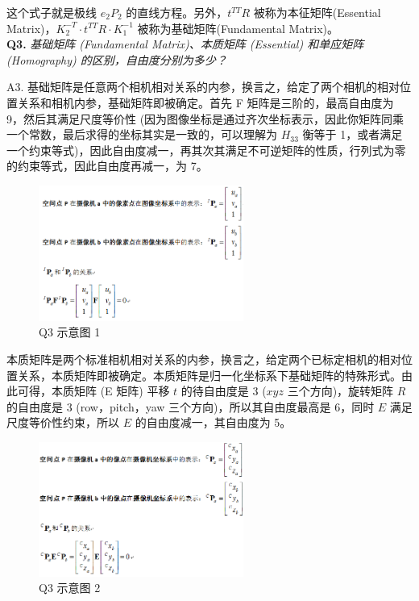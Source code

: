 \documentclass[cn,10pt,math=newtx,citestyle=gb7714-2015,bibstyle=gb7714-2015]{elegantbook}
\begin{document}
这个式子就是极线 $e_2P_2$ 的直线方程。另外，$t^{TT}R$ 被称为本征矩阵(Essential Matrix)，$K_2^{-T} \cdot   t^{TT}R\cdot K_1^{-1}$ 被称为基础矩阵(Fundamental Matrix)。\\


\textbf{Q3.} \textit{基础矩阵 (Fundamental Matrix)、本质矩阵 (Essential) 和单应矩阵 (Homography) 的区别，自由度分别为多少？}


A3. 基础矩阵是任意两个相机相对关系的内参，换言之，给定了两个相机的相对位置关系和相机内参，基础矩阵即被确定。首先 F 矩阵是三阶的，最高自由度为 9，然后其满足尺度等价性 (因为图像坐标是通过齐次坐标表示，因此你矩阵同乘一个常数，最后求得的坐标其实是一致的，可以理解为 $H_{33}$ 衡等于 1，或者满足一个约束等式)，因此自由度减一，再其次其满足不可逆矩阵的性质，行列式为零的约束等式，因此自由度再减一，为 7。


\begin{figure}[ht]
  \centering
  \includegraphics[width=0.6\textwidth]{image/2.4.q3.1.png}
  \caption{Q3 示意图 1}
\end{figure}


本质矩阵是两个标准相机相对关系的内参，换言之，给定两个已标定相机的相对位置关系，本质矩阵即被确定。本质矩阵是归一化坐标系下基础矩阵的特殊形式。由此可得，本质矩阵 (E 矩阵) 平移 $t$ 的待自由度是 3 ($xyz$ 三个方向)，旋转矩阵 $R$ 的自由度是 3 (row，pitch，yaw 三个方向)，所以其自由度最高是 6，同时 $E$ 满足尺度等价性约束，所以 $E$ 的自由度减一，其自由度为 5。


\begin{figure}[ht]
  \centering
  \includegraphics[width=0.6\textwidth]{image/2.4.q3.2.png}
  \caption{Q3 示意图 2}
\end{figure}
\end{document}
